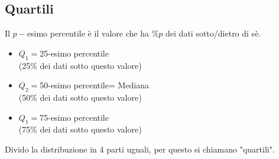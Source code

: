 \documentclass{article}  %
\theoremstyle{definition}
\begin{document}
\subsection{Quartili}
Il $p-$esimo percentile è il valore che ha $\%p$ dei dati sotto/dietro di sè.
\begin{itemize}
	\item $Q_1=$25-esimo percentile \\
	      (25\% dei dati sotto questo valore)
	\item $Q_2=$50-esimo percentile= Mediana \\
	      (50\% dei dati sotto questo valore)
	\item $Q_1=$75-esimo percentile \\
	      (75\% dei dati sotto questo valore)
\end{itemize}
Divido la distribuzione in 4 parti uguali, per questo si chiamano "quartili". \\
\end{document}
